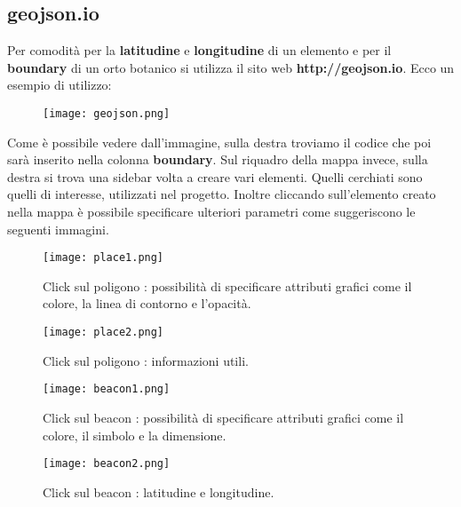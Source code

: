 \subsection{geojson.io}
Per comodità per la \textbf{latitudine} e \textbf{longitudine} di un elemento e per il \textbf{boundary} di un orto botanico si utilizza il sito web \textbf{http://geojson.io}. Ecco un esempio di utilizzo:

\begin{figure}[h]
	\centering
	\texttt{[image: geojson.png]}
\end{figure}

Come è possibile vedere dall'immagine, sulla destra troviamo il codice che poi sarà inserito nella colonna \textbf{boundary}. Sul riquadro della mappa invece, sulla destra si trova una sidebar volta a creare vari elementi. Quelli cerchiati sono quelli di interesse, utilizzati nel progetto. \newline 
Inoltre cliccando sull'elemento creato nella mappa è possibile specificare ulteriori parametri come suggeriscono le seguenti immagini.

\begin{figure}[H]
	\centering
	\texttt{[image: place1.png]}
	\caption{Click sul poligono : possibilità di specificare attributi grafici come il colore, la linea di contorno e l'opacità.}
\end{figure}

\begin{figure}[H]
	\centering
	\texttt{[image: place2.png]}
	\caption{Click sul poligono : informazioni utili.}
\end{figure}

\begin{figure}[H]
	\centering
	\texttt{[image: beacon1.png]}
	\caption{Click sul beacon : possibilità di specificare attributi grafici come il colore, il simbolo e la dimensione.}
\end{figure}

\begin{figure}[H]
	\centering
	\texttt{[image: beacon2.png]}
	\caption{Click sul beacon : latitudine e longitudine.}
\end{figure}

